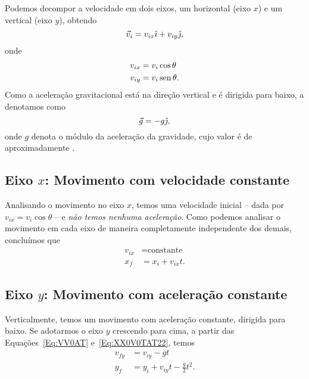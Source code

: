 Podemos decompor a velocidade em dois eixos, um horizontal (eixo $x$) e um vertical (eixo $y$), obtendo
\begin{equation}
  \vec{v}_i = v_{ix} \hat{\imath} + v_{iy} \hat{\jmath},
\end{equation}
%
onde
\begin{align}
  v_{ix} &= v_i\cos\theta \\
  v_{iy} &= v_i\operatorname{sen}\theta.
\end{align}
%
Como a aceleração gravitacional está na direção vertical e é dirigida para baixo, a denotamos como
\begin{equation}
  \vec{g} = -g\hat{\jmath},
\end{equation}
%
onde $g$ denota o módulo da aceleração da gravidade, cujo valor é de aproximadamente .

\subsection{Eixo $x$: Movimento com velocidade constante}

Analisando o movimento no eixo $x$, temos uma velocidade inicial -- dada por $v_{ix} = v_i\cos\theta$ -- e \emph{não temos nenhuma aceleração}. Como podemos analisar o movimento em cada eixo de maneira completamente independente dos demais, concluímos que
\begin{align}
  v_{ix} &= \text{constante} \\
  x_{f} &= x_{i} + v_{ix}t.\label{Eq:PosXProj}
\end{align}

\subsection{Eixo $y$: Movimento com aceleração constante}

Verticalmente, temos um movimento com aceleração constante, dirigida para baixo. Se adotarmos o eixo $y$ crescendo para cima, a partir das Equações~\eqref{Eq:VV0AT} e~\eqref{Eq:XX0V0TAT22}, temos
\begin{align}
  v_{fy} &= v_{iy} - gt \\
  y_f &= y_i + v_{iy}t - \frac{g}{2}t^2. \label{Eq:PosYProj}
\end{align}

